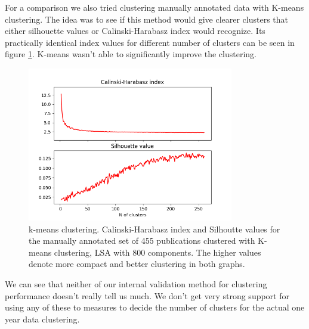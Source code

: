 For a comparison we also tried clustering manually annotated data
with K-means clustering. The idea was to see if this method would
give clearer clusters that either silhouette values or 
Calinski-Harabasz index would recognize. Its practically identical
index values for different number of clusters can be seen in 
figure \ref{fig:ch-silh02}. K-means wasn't able to significantly 
improve the clustering.

\begin{figure}[htp]
  \begin{center}    
\includegraphics[width=9.0cm]{images/c-h-silh-index-plot-519-2_260-800-kmeans.png}
    \caption{k-means clustering. Calinski-Harabasz index and Silhoutte values for the
    manually annotated set of 455 publications clustered with K-means 
    clustering, LSA with 800 components. The higher values denote 
    more compact and better clustering in both graphs.}
    \label{fig:ch-silh02}
  \end{center}
\end{figure}

We can see that neither of our internal validation method for 
clustering performance doesn't really tell us much. 
We don't get very strong support for using any of these to measures
to decide the number of clusters for the actual one year data 
clustering.




